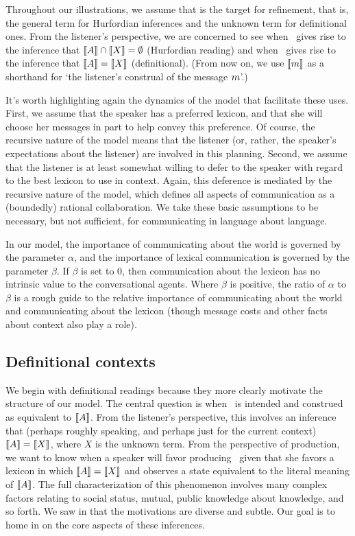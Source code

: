 \documentclass[12pt,twoside]{article}
\renewcommand{\_}{\textbf{\textunderscore\hspace{-4pt}\textunderscore\hspace{-3pt}\textunderscore\hspace{-4pt}\textunderscore}\hspace{0.5pt}}			%
\begin{document}
Throughout our illustrations, we assume that  is the target
for refinement, that is, the general term for Hurfordian inferences
and the unknown term for definitional ones.  From the listener's
perspective, we are concerned to see when \AorX\ gives rise to
the inference that $\llbracket A\rrbracket \cap \llbracket X\rrbracket = \emptyset$ (Hurfordian
reading) and when \AorX\ gives rise to the inference that
$\llbracket A\rrbracket = \llbracket X\rrbracket$ (definitional). (From now on, we use $\llbracket m\rrbracket$
as a shorthand for `the listener's construal of the message $m$'.)

It's worth highlighting again the dynamics of the model that
facilitate these uses. First, we assume that the speaker has a
preferred lexicon, and that she will choose her messages in part to
help convey this preference. Of course, the recursive nature of the
model means that the listener (or, rather, the speaker's expectations
about the listener) are involved in this planning. Second, we assume
that the listener is at least somewhat willing to defer to the speaker
with regard to the best lexicon to use in context. Again, this
deference is mediated by the recursive nature of the model, which
defines all aspects of communication as a (boundedly) rational
collaboration. We take these basic assumptions to be necessary, but
not sufficient, for communicating in language about language.

In our model, the importance of communicating about the world is
governed by the parameter $\alpha$, and the importance of lexical
communication is governed by the parameter $\beta$. If $\beta$ is set
to $0$, then communication about the lexicon has no intrinsic value to
the conversational agents.  Where $\beta$ is positive, the ratio of
$\alpha$ to $\beta$ is a rough guide to the relative importance of
communicating about the world and communicating about the lexicon
(though message costs and other facts about context also play a role).


\subsection{Definitional contexts}\label{sec:analysis:definitional}

We begin with definitional readings because they more clearly motivate
the structure of our model. The central question is when
\AorX\ is intended and construed as equivalent to
$\llbracket A\rrbracket$. From the listener's perspective, this involves an inference
that (perhaps roughly speaking, and perhaps just for the current
context) $\llbracket A\rrbracket=\llbracket X\rrbracket$, where $X$ is the unknown term. From the
perspective of production, we want to know when a speaker will favor
producing \AorX\ given that she favors a lexicon in which
$\llbracket A\rrbracket=\llbracket X\rrbracket$ and observes a state equivalent to the literal
meaning of $\llbracket A\rrbracket$. The full characterization of this phenomenon
involves many complex factors relating to social status, mutual,
public knowledge about knowledge, and so forth. We saw in
 that the motivations are diverse and subtle. Our
goal is to home in on the core aspects of these inferences.
\end{document}
